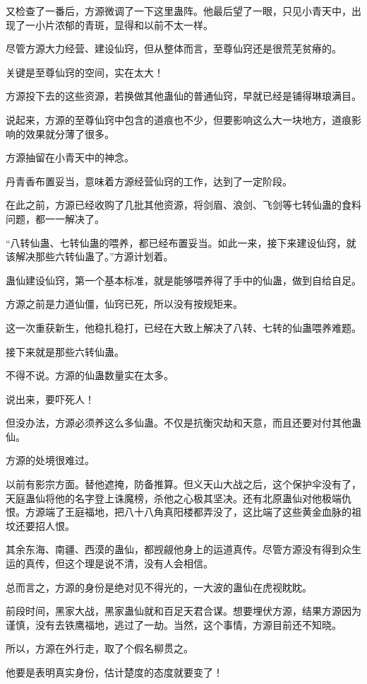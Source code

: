\begin{this_body}
又检查了一番后，方源微调了一下这里蛊阵。他最后望了一眼，只见小青天中，出现了一小片浓郁的青斑，显得和以前不太一样。

尽管方源大力经营、建设仙窍，但从整体而言，至尊仙窍还是很荒芜贫瘠的。

关键是至尊仙窍的空间，实在太大！

方源投下去的这些资源，若换做其他蛊仙的普通仙窍，早就已经是铺得琳琅满目。

说起来，方源的至尊仙窍中包含的道痕也不少，但要影响这么大一块地方，道痕影响的效果就分薄了很多。

方源抽留在小青天中的神念。

丹青香布置妥当，意味着方源经营仙窍的工作，达到了一定阶段。

在此之前，方源已经收购了几批其他资源，将剑眉、浪剑、飞剑等七转仙蛊的食料问题，都一一解决了。

“八转仙蛊、七转仙蛊的喂养，都已经布置妥当。如此一来，接下来建设仙窍，就该解决那些六转仙蛊了。”方源计划着。

蛊仙建设仙窍，第一个基本标准，就是能够喂养得了手中的仙蛊，做到自给自足。

方源之前是力道仙僵，仙窍已死，所以没有按规矩来。

这一次重获新生，他稳扎稳打，已经在大致上解决了八转、七转的仙蛊喂养难题。

接下来就是那些六转仙蛊。

不得不说。方源的仙蛊数量实在太多。

说出来，要吓死人！

但没办法，方源必须养这么多仙蛊。不仅是抗衡灾劫和天意，而且还要对付其他蛊仙。

方源的处境很难过。

以前有影宗方面。替他遮掩，防备推算。但义天山大战之后，这个保护伞没有了，天庭蛊仙将他的名字登上诛魔榜，杀他之心极其坚决。还有北原蛊仙对他极端仇恨。方源端了王庭福地，把八十八角真阳楼都弄没了，这比端了这些黄金血脉的祖坟还要招人恨。

其余东海、南疆、西漠的蛊仙，都觊觎他身上的运道真传。尽管方源没有得到众生运的真传，但这个理是说不清，没有人会相信。

总而言之，方源的身份是绝对见不得光的，一大波的蛊仙在虎视眈眈。

前段时间，黑家大战，黑家蛊仙就和百足天君合谋。想要埋伏方源，结果方源因为谨慎，没有去铁鹰福地，逃过了一劫。当然，这个事情，方源目前还不知晓。

所以，方源在外行走，取了个假名柳贯之。

他要是表明真实身份，估计楚度的态度就要变了！


\end{this_body}
